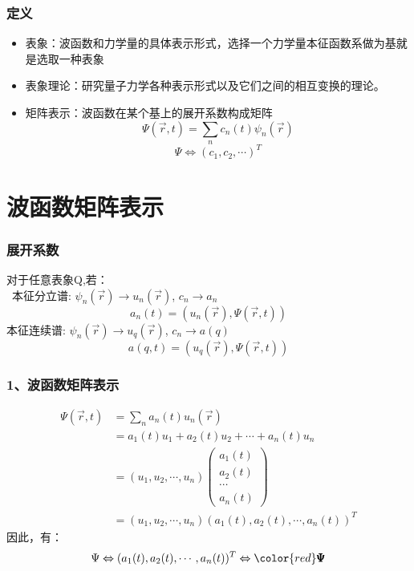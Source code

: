 \begin{frame} 
    \frametitle{定义}
    \begin{definition}
        \begin{itemize}
            \item 表象：波函数和力学量的具体表示形式，选择一个力学量本征函数系做为基就是选取一种表象
            \item 表象理论：研究量子力学各种表示形式以及它们之间的相互变换的理论。
            \item 矩阵表示：波函数在某个基上的展开系数构成矩阵 
        $$ \Psi(\vec{r},t)=\sum_n c_n(t) \psi_n(\vec{r})$$ 
        $$ \Psi\Leftrightarrow(c_1,c_2,\cdots)^T $$
        \end{itemize}   
    \end{definition}
\end{frame} 

\section{波函数矩阵表示}
\begin{frame} 
    \frametitle{展开系数}    
    对于任意表象Q,若：\\
     本征分立谱: $\psi_n(\vec{r}) \to u_n(\vec{r})$, $c_n \to a_n $
        \begin{equation*}
            a_n(t)=(u_n(\vec{r}), \Psi(\vec{r},t)) 
        \end{equation*}  
    本征连续谱: $\psi_n(\vec{r}) \to u_q(\vec{r})$, $c_n \to a(q) $
        \begin{equation*}
            a(q,t)=(u_q(\vec{r}), \Psi(\vec{r},t)) 
        \end{equation*}  
\end{frame} 

\begin{frame} 
        \frametitle{1、波函数矩阵表示} 
        \begin{equation*}
            \begin{split} 
                \Psi(\vec{r},t)&=\sum_n a_n(t) u_n(\vec{r}) \\
                &=a_1(t) u_1+ a_2(t) u_2+\cdots+ a_n(t) u_n \\
                &=(u_1,u_2,\cdots,u_n) 
               \begin{pmatrix}
                    a_1(t)\\
                    a_2(t)\\
                    \cdots\\
                    a_n(t)
                \end{pmatrix} \\
                &= (u_1,u_2,\cdots,u_n) (a_1(t),a_2(t),\cdots, a_n(t))^T
            \end{split}  
        \end{equation*}  
        因此，有： $$   \Psi \Leftrightarrow (a_1(t),a_2(t),\cdots, a_n(t))^T \Leftrightarrow {\color{red}  \pmb {\Psi} } $$
\end{frame}

